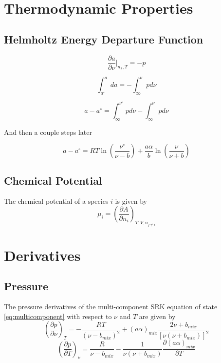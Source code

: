 \documentclass{article}
\newcommand{\pderiv}[2]{\frac{\partial #1}{\partial #2}}
\newcommand{\pderivconst}[3]{\left(\pderiv{#1}{#2}\right)_{#3}}
\begin{document}
\section{Thermodynamic Properties}
\subsection{Helmholtz Energy Departure Function}

\begin{equation}
    \pderiv{a}{\nu}\biggr\rvert_{n_k,T} = -p
\end{equation}

\begin{equation}
    \int_{a^\circ}^a da = -\int_{\infty}^{\nu} p d\nu
\end{equation}

\begin{equation}
    a - a^\circ = \int_{\infty}^{\nu^\circ}pd\nu - \int_{\infty}^{\nu}pd\nu
\end{equation}

And then a couple steps later

\begin{equation}
    a - a^\circ = RT \ln\left(\frac{\nu^\circ}{\nu - b}\right) + \frac{a\alpha}{b}\ln\left(\frac{\nu}{\nu+b}\right)
\end{equation}

\subsection{Chemical Potential}
The chemical potential of a species $i$ is given by
\begin{equation}
    \mu_i = \pderivconst{A}{n_i}{T,V,n_{j\neq i}}
\end{equation}

\section{Derivatives}
\subsection{Pressure}
The pressure derivatives of the multi-component SRK equation of state \eqref{eq:multicomponent} with respect to $\nu$ and $T$ are given by
\begin{equation}
    \pderivconst{p}{\nu}{T} = -\frac{RT}{(\nu-b_{mix})^2} + (a\alpha)_{mix}\frac{2\nu+b_{mix}}{[\nu(\nu+b_{mix})]^2} \label{dpdv}
\end{equation}
\begin{equation}
    \pderivconst{p}{T}{\nu} = \frac{R}{\nu-b_{mix}} - \frac{1}{\nu(\nu+b_{mix})}\frac{\partial (a\alpha)_{mix}}{\partial T} \label{dpdT}
\end{equation}
\end{document}
